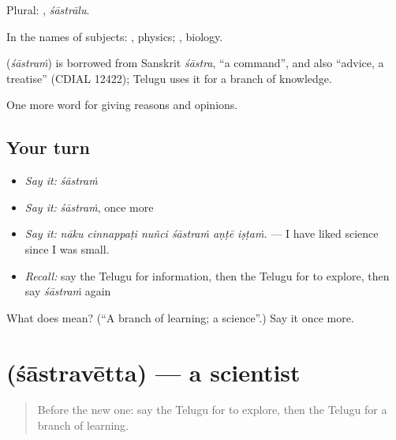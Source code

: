 Plural: , \emph{śāstrālu}.

In the names of subjects: , physics; , biology.

\begin{cousinweb}
\textbf{} (\emph{śāstraṁ}) is borrowed from Sanskrit \emph{śāstra}, \textquotedblleft{}a command\textquotedblright{}, and also \textquotedblleft{}advice, a treatise\textquotedblright{} (CDIAL 12422); Telugu uses it for a branch of knowledge.
\end{cousinweb}

\begin{grammarlens}[title={What you've built}]
One more word for giving reasons and opinions.
\end{grammarlens}

\subsection*{Your turn}
\begin{itemize}
\raggedright
  \item \emph{Say it:} \emph{śāstraṁ}
  \item \emph{Say it:} \emph{śāstraṁ}, once more
  \item \emph{Say it:} \emph{nāku cinnappaṭi nuñci śāstraṁ aṇṭē iṣṭaṁ.} — I have liked science since I was small.
  \item \emph{Recall:} say the Telugu for information, then the Telugu for to explore, then say \emph{śāstraṁ} again
\end{itemize}

\begin{tcolorbox}[breakable,colback=teal!4,colframe=teal!35!black,title={Before you move on}]
What does  mean? (\textquotedblleft{}A branch of learning; a science\textquotedblright{}.) Say it once more.
\end{tcolorbox}
\section[\texorpdfstring{\te{శాస్త్రవేత్త} (śāstravētta)}{శాస్త్రవేత్త (śāstravētta)}]{ (śāstravētta) — a scientist}

\label{lesson:TE-C413-sastravetta}



\begin{quote}
Before the new one: say the Telugu for to explore, then the Telugu for a branch of learning.
\end{quote}

